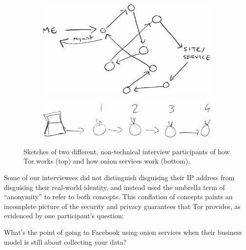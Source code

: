 \begin{figure}[t]
    \centering

    \begin{subfigure}[t]{\linewidth}
        \centering
        \includegraphics[width=0.8\linewidth]{figures/tor-sketch.jpg}
        \label{fig:tor-sketch}
    \end{subfigure}

    \begin{subfigure}[t]{\linewidth}
        \centering
        \includegraphics[width=0.8\linewidth]{figures/os-sketch.jpg}
        \label{fig:os-sketch}
    \end{subfigure}

    \caption{Sketches of two different, non-technical interview participants of
    how Tor works (top) and how onion services work (bottom).}
\end{figure}

Some of our interviewees did not distinguish disguising their IP address from
disguising their real-world identity, and instead used the umbrella term of
``anonymity'' to refer to both concepts.  This conflation of concepts paints an
incomplete picture of the security and privacy guarantees that Tor provides,
as evidenced by one participant's question:

\begin{displayquote}[P07]
What's the point of going to Facebook using onion services when their business
model is still about collecting your data?
\end{displayquote}

